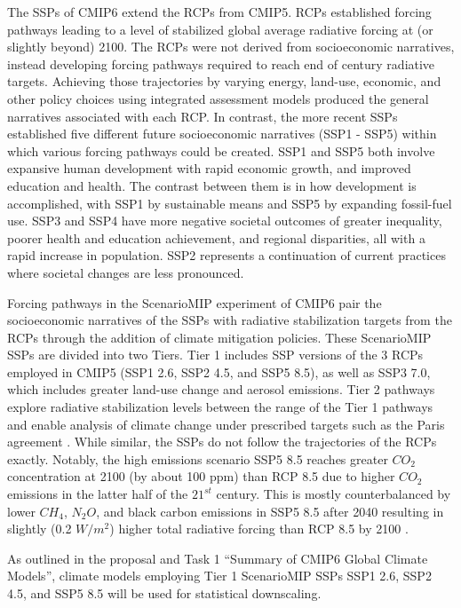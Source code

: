 \documentclass[]{scrartcl}
\begin{document}
The SSPs of CMIP6 extend the RCPs from CMIP5. RCPs established forcing pathways leading to a level of stabilized global average radiative forcing at (or slightly beyond) 2100. The RCPs were not derived from socioeconomic narratives, instead developing forcing pathways required to reach end of century radiative targets. Achieving those trajectories by varying energy, land-use, economic, and other policy choices using integrated assessment models produced the general narratives associated with each RCP. In contrast, the more recent SSPs established five different future socioeconomic narratives (SSP1 - SSP5) within which various forcing pathways could be created. SSP1 and SSP5 both involve expansive human development with rapid economic growth, and improved education and health. The contrast between them is in how development is accomplished, with SSP1 by sustainable means and SSP5 by expanding fossil-fuel use. SSP3 and SSP4 have more negative societal outcomes of greater inequality, poorer health and education achievement, and regional disparities, all with a rapid increase in population. SSP2 represents a continuation of current practices where societal changes are less pronounced. 

Forcing pathways in the ScenarioMIP experiment of CMIP6 pair the socioeconomic narratives of the SSPs with radiative stabilization targets from the RCPs through the addition of climate mitigation policies. These ScenarioMIP SSPs are divided into two Tiers. Tier 1 includes SSP versions of the 3 RCPs employed in CMIP5 (SSP1 2.6, SSP2 4.5, and SSP5 8.5), as well as SSP3 7.0, which includes greater land-use change and aerosol emissions. Tier 2 pathways explore radiative stabilization levels between the range of the Tier 1 pathways and enable analysis of climate change under prescribed targets such as the Paris agreement \citep{oneill_scenario_2016}. While similar, the SSPs do not follow the trajectories of the RCPs exactly. Notably, the high emissions scenario SSP5 8.5 reaches greater $CO_2$ concentration at 2100 (by about 100 ppm) than RCP 8.5 due to higher $CO_2$ emissions in the latter half of the $21^{st}$ century. This is mostly counterbalanced by lower $CH_4$, $N_2O$, and black carbon emissions in SSP5 8.5 after 2040 resulting in slightly (0.2 $W/m^2$) higher total radiative forcing than RCP 8.5 by 2100 \citep{Riahi2017}. 

As outlined in the proposal and Task 1 ``Summary of CMIP6 Global Climate Models'', climate models employing Tier 1 ScenarioMIP SSPs SSP1 2.6, SSP2 4.5, and SSP5 8.5 will be used for statistical downscaling. 
\end{document}
